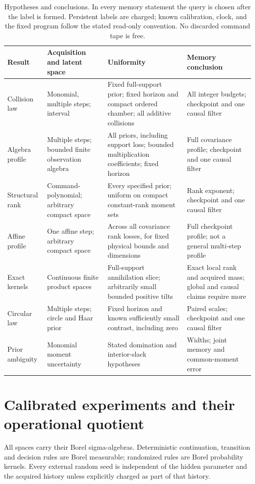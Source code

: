 \documentclass[11pt]{amsart}
\theoremstyle{definition}\newtheorem{definition}[theorem]{Definition}
\theoremstyle{remark}\newtheorem{remark}[theorem]{Remark}
\begin{document}
\begin{table}[tbp]
\centering\footnotesize
\setlength{\tabcolsep}{4pt}
\begin{tabular}{@{}p{}p{}p{}p{}@{}}
\toprule
Result & Acquisition and latent space & Uniformity & Memory conclusion\\
\midrule
Collision law & Monomial, multiple steps; interval & Fixed full-support
prior; fixed horizon and compact ordered chamber; all additive collisions
& All integer budgets; checkpoint and one causal filter\\[3pt]
Algebra profile & Multiple steps; bounded finite observation algebra &
All priors, including support loss; bounded multiplication coefficients;
fixed horizon & Full covariance profile; checkpoint and one causal filter\\[3pt]
Structural rank & Command-polynomial; arbitrary compact space & Every
specified prior; uniform on compact constant-rank moment sets & Rank
exponent; checkpoint and one causal filter\\[3pt]
Affine profile & One affine step; arbitrary compact space & Across all
covariance rank losses, for fixed physical bounds and dimensions & Full
checkpoint profile; not a general multi-step profile\\[3pt]
Exact kernels & Continuous finite product spaces & Full-support
annihilation slice; arbitrarily small bounded positive tilts & Exact local
rank and acquired mass; global and causal claims require more\\[3pt]
Circular law & Multiple steps; circle and Haar prior & Fixed horizon and
known sufficiently small contrast, including zero & Paired scales;
checkpoint and one causal filter\\[3pt]
Prior ambiguity & Monomial moment uncertainty & Stated domination and
interior-slack hypotheses & Widths; joint memory and common-moment error\\
\bottomrule
\end{tabular}
\caption{Hypotheses and conclusions. In every memory statement the query
is chosen after the label is formed. Persistent labels are charged;
known calibration, clock, and the fixed program follow the stated
read-only convention. No discarded command tape is free.}
\label{tab:scope}
\end{table}

\section{Calibrated experiments and their operational quotient}\label{sec:experiment}
All spaces carry their Borel sigma-algebras. Deterministic continuation,
transition and decision rules are Borel measurable; randomized rules are
Borel probability kernels. Every external random seed is independent of
the hidden parameter and the acquired history unless explicitly charged
as part of that history.
\end{document}
